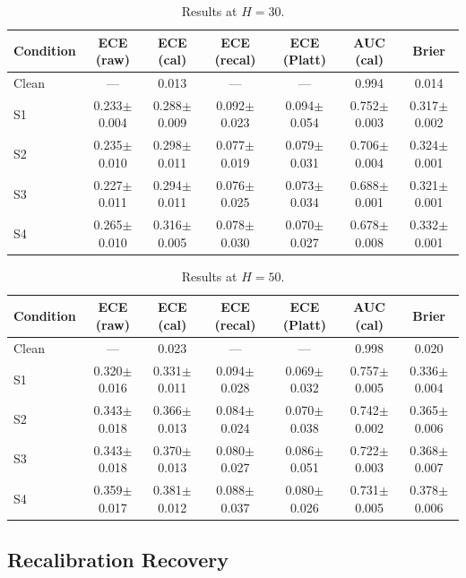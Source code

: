 \documentclass[11pt,a4paper]{article}
\begin{document}
\begin{table}[htbp]
\centering
\caption{Results at \(H=30\).}
\label{tab:h30}
\small
\begin{tabular}{@{}lcccccc@{}}
\toprule
Condition & ECE (raw) & ECE (cal) & ECE (recal) & ECE (Platt) & AUC (cal) & Brier \\
\midrule
Clean & --- & 0.013 & --- & --- & 0.994 & 0.014 \\
S1 & 0.233$\pm$0.004 & 0.288$\pm$0.009 & 0.092$\pm$0.023 & 0.094$\pm$0.054 & 0.752$\pm$0.003 & 0.317$\pm$0.002 \\
S2 & 0.235$\pm$0.010 & 0.298$\pm$0.011 & 0.077$\pm$0.019 & 0.079$\pm$0.031 & 0.706$\pm$0.004 & 0.324$\pm$0.001 \\
S3 & 0.227$\pm$0.011 & 0.294$\pm$0.011 & 0.076$\pm$0.025 & 0.073$\pm$0.034 & 0.688$\pm$0.001 & 0.321$\pm$0.001 \\
S4 & 0.265$\pm$0.010 & 0.316$\pm$0.005 & 0.078$\pm$0.030 & 0.070$\pm$0.027 & 0.678$\pm$0.008 & 0.332$\pm$0.001 \\
\bottomrule
\end{tabular}
\end{table}

\begin{table}[htbp]
\centering
\caption{Results at \(H=50\).}
\label{tab:h50}
\small
\begin{tabular}{@{}lcccccc@{}}
\toprule
Condition & ECE (raw) & ECE (cal) & ECE (recal) & ECE (Platt) & AUC (cal) & Brier \\
\midrule
Clean & --- & 0.023 & --- & --- & 0.998 & 0.020 \\
S1 & 0.320$\pm$0.016 & 0.331$\pm$0.011 & 0.094$\pm$0.028 & 0.069$\pm$0.032 & 0.757$\pm$0.005 & 0.336$\pm$0.004 \\
S2 & 0.343$\pm$0.018 & 0.366$\pm$0.013 & 0.084$\pm$0.024 & 0.070$\pm$0.038 & 0.742$\pm$0.002 & 0.365$\pm$0.006 \\
S3 & 0.343$\pm$0.018 & 0.370$\pm$0.013 & 0.080$\pm$0.027 & 0.086$\pm$0.051 & 0.722$\pm$0.003 & 0.368$\pm$0.007 \\
S4 & 0.359$\pm$0.017 & 0.381$\pm$0.012 & 0.088$\pm$0.037 & 0.080$\pm$0.026 & 0.731$\pm$0.005 & 0.378$\pm$0.006 \\
\bottomrule
\end{tabular}
\end{table}

\subsection{Recalibration Recovery}\label{sec:recal}
\end{document}
